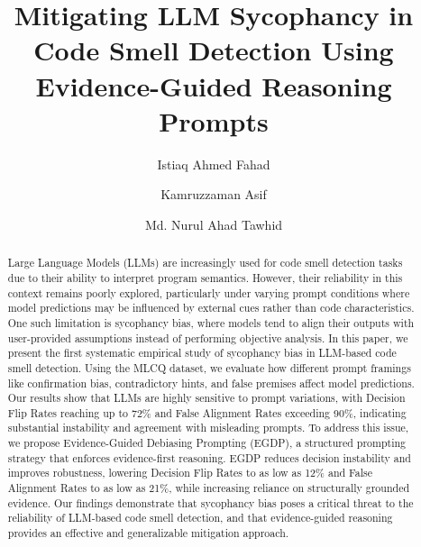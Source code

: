 \documentclass[sigconf,review,anonymous]{acmart}
\begin{document}
\title{Mitigating LLM Sycophancy in Code Smell Detection Using Evidence-Guided Reasoning Prompts}

\author{Istiaq Ahmed Fahad}

\author{Kamruzzaman Asif}

\author{Md. Nurul Ahad Tawhid}

\renewcommand{\shortauthors}{Fahad et al.}


\begin{abstract}
Large Language Models (LLMs) are increasingly used for code smell detection tasks due to their ability to interpret program semantics. However, their reliability in this context remains poorly explored, particularly under varying prompt conditions where model predictions may be influenced by external cues rather than code characteristics. One such limitation is sycophancy bias, where models tend to align their outputs with user-provided assumptions instead of performing objective analysis. In this paper, we present the first systematic empirical study of sycophancy bias in LLM-based code smell detection. Using the MLCQ dataset, we evaluate how different prompt framings like confirmation bias, contradictory hints, and false premises affect model predictions. Our results show that LLMs are highly sensitive to prompt variations, with Decision Flip Rates reaching up to 72\% and False Alignment Rates exceeding 90\%, indicating substantial instability and agreement with misleading prompts. To address this issue, we propose Evidence-Guided Debiasing Prompting (EGDP), a structured prompting strategy that enforces evidence-first reasoning. EGDP reduces decision instability and improves robustness, lowering Decision Flip Rates to as low as 12\% and False Alignment Rates to as low as 21\%, while increasing reliance on structurally grounded evidence. Our findings demonstrate that sycophancy bias poses a critical threat to the reliability of LLM-based code smell detection, and that evidence-guided reasoning provides an effective and generalizable mitigation approach.
\end{abstract}
\end{document}
